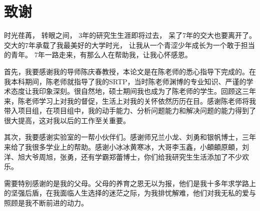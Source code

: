 \chapter*{致\qquad{}谢}
时光荏苒，
转眼之间，
3年的研究生生涯即将过去，
呆了7年的交大也要离开了。
交大的7年承载了我最美好的大学时光，
让我从一个青涩少年成长为一个敢于担当的青年。
7年一路走来，有那么人在帮助我，让我心怀感恩。
\par
首先，我要感谢我的导师陈庆春教授，本论文是在陈老师的悉心指导下完成的。在我本科期间，陈老师就指导了我的SRTP，当时陈老师渊博的专业知识、严谨的学术态度让我印象深刻。很自然地，硕士期间我也成为了陈老师的学生。回顾这三年来，陈老师学习上对我的督促，生活上对我的关怀依然历历在目。感谢陈老师将我带入项目组，在项目组中，我的动手能力、分析问题能力和解决问题的能力得到了很大提高，这对我以后的工作至关重要。
\par
其次，我要感谢实验室的一帮小伙伴们。感谢师兄兰小龙、刘勇和银帆博士，三年来给了我很多学业上的帮助。感谢小冰冰黄寒冰，大哥李玉鑫，小頔頔原頔，刘洋、旭大爷周旭，张勇，还有学霸郑蕾博士，你们给我研究生生活添加了不少欢乐。
\par
需要特别感谢的是我的父母。父母的养育之恩无以为报，他们是我十多年求学路上的坚强后盾，在我面临人生选择的迷茫之际，为我排忧解难，他们对我无私的爱与照顾是我不断前进的动力。